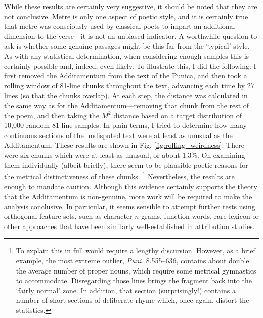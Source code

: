 \documentclass[11pt,a4paper]{scrartcl} %
\begin{document}
{While these results are certainly very suggestive, it should be noted that they are not conclusive. Metre is only one aspect of poetic style, and it is certainly true that metre was consciously used by classical poets to impart an additional dimension to the verse---it is not an unbiased indicator. A worthwhile question to ask is whether some genuine passages might be this far from the `typical' style. As with any statistical determination, when considering enough samples this is certainly possible and, indeed, even likely. To illustrate this, I did the following: I first removed the Additamentum from the text of the Punica, and then took a rolling window of 81-line chunks throughout the text, advancing each time by 27 lines (so that the chunks overlap). At each step, the distance was calculated in the same way as for the Additamentum---removing that chunk from the rest of the poem, and then taking the $M^{2}$ distance based on a target distribution of 10,000 random 81-line samples. In plain terms, I tried to determine how many continuous sections of the undisputed text were at least as unusual as the Additamentum. These results are shown in Fig. \ref{fig:rolling_weirdness}. There were six chunks which were at least as unusual, or about 1.3\%. On examining them individually (albeit briefly), there seem to be plausible poetic reasons for the metrical distinctiveness of these chunks.%
\footnote{To explain this in full would require a lengthy discursion. However, as a brief example, the most extreme outlier, \textit{Puni.} 8.555--636, contains about double the average number of proper nouns, which require some metrical gymnastics to accommodate. Disregarding those lines brings the fragment back into the `fairly normal' zone. In addition, that section (surprisingly!) contains a number of short sections of deliberate rhyme which, once again, distort the statistics.}
Nevertheless, the results are enough to mandate caution. Although this evidence certainly supports the theory that the Additamentum is non-genuine, more work will be required to make the analysis conclusive. In particular, it seems sensible to attempt further tests using orthogonal feature sets, such as character $n$-grams, function words, rare lexicon or other approaches that have been similarly well-established in attribution studies.

}
\end{document}
